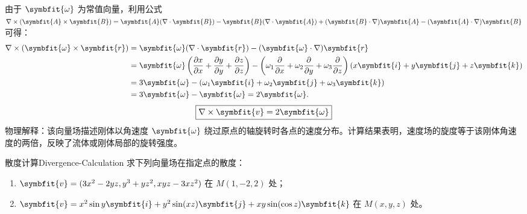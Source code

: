 \begin{solution}
    由于 $\symbfit{\omega}$ 为常值向量，利用公式 $\nabla \times (\symbfit{A} \times \symbfit{B}) = \symbfit{A}(\nabla \cdot \symbfit{B}) - \symbfit{B}(\nabla \cdot \symbfit{A}) + (\symbfit{B} \cdot \nabla) \symbfit{A} - (\symbfit{A} \cdot \nabla) \symbfit{B}$ 可得：
    \begin{equation}
        \begin{aligned}
            \nabla \times (\symbfit{\omega} \times \symbfit{r}) & = \symbfit{\omega} (\nabla \cdot \symbfit{r}) - (\symbfit{\omega} \cdot \nabla) \symbfit{r}                                                                                                                                                                                                                         \\
                                                                & = \symbfit{\omega} \left( \frac{\partial x}{\partial x} + \frac{\partial y}{\partial y} + \frac{\partial z}{\partial z} \right) - \left( \omega_1 \frac{\partial}{\partial x} + \omega_2 \frac{\partial}{\partial y} + \omega_3 \frac{\partial}{\partial z} \right) (x \symbfit{i} + y \symbfit{j} + z \symbfit{k}) \\
                                                                & = 3 \symbfit{\omega} - (\omega_1 \symbfit{i} + \omega_2 \symbfit{j} + \omega_3 \symbfit{k})                                                                                                                                                                                                                         \\
                                                                & = 3 \symbfit{\omega} - \symbfit{\omega} = 2 \symbfit{\omega}.
        \end{aligned}
    \end{equation}
    \begin{equation}
        \boxed{\nabla \times \symbfit{v} = 2 \symbfit{\omega}}
    \end{equation}
    物理解释：该向量场描述刚体以角速度 $\symbfit{\omega}$ 绕过原点的轴旋转时各点的速度分布。计算结果表明，速度场的旋度等于该刚体角速度的两倍，反映了流体或刚体局部的旋转强度。
\end{solution}


\begin{problem}{散度计算}{Divergence-Calculation}
    求下列向量场在指定点的散度：
    \begin{enumerate}
        \item $\symbfit{v} = (3x^2 - 2yz, y^3 + yz^2, xyz - 3xz^2)$ 在 $M(1, -2, 2)$ 处；
        \item $\symbfit{v} = x^2 \sin y \symbfit{i} + y^2 \sin(xz) \symbfit{j} + xy \sin(\cos z) \symbfit{k}$ 在 $M(x, y, z)$ 处。
    \end{enumerate}
\end{problem}

